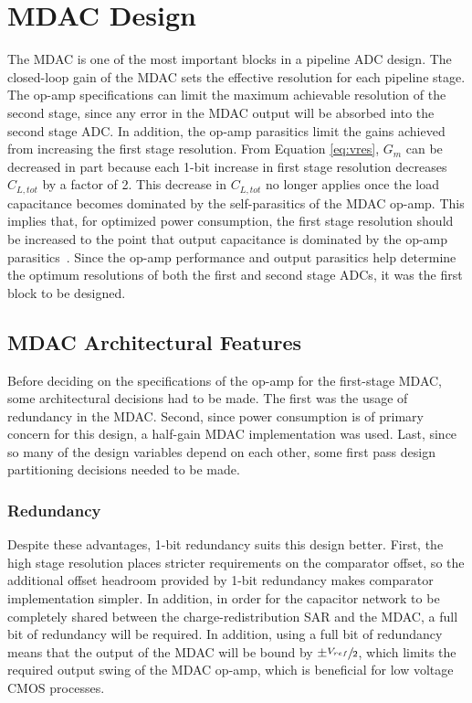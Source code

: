 \chapter{MDAC Design}
The MDAC is one of the most important blocks in a pipeline ADC design. The closed-loop gain of the MDAC sets the effective resolution for each pipeline stage. The op-amp specifications can limit the maximum achievable resolution of the second stage, since any error in the MDAC output will be absorbed into the second stage ADC. In addition, the op-amp parasitics limit the gains achieved from increasing the first stage resolution. From Equation \ref{eq:vres}, $G_m$ can be decreased in part because each 1-bit increase in first stage resolution decreases $C_{L,tot}$ by a factor of 2. This decrease in $C_{L,tot}$ no longer applies once the load capacitance becomes dominated by the self-parasitics of the MDAC op-amp. This implies that, for optimized power consumption, the first stage resolution should be increased to the point that output capacitance is dominated by the op-amp parasitics~\cite{5714725}. Since the op-amp performance and output parasitics help determine the optimum resolutions of both the first and second stage ADCs, it was the first block to be designed. 
\section{MDAC Architectural Features}
Before deciding on the specifications of the op-amp for the first-stage MDAC, some architectural decisions had to be made. The first was the usage of redundancy in the MDAC. Second, since power consumption is of primary concern for this design, a half-gain MDAC implementation was used. Last, since so many of the design variables depend on each other, some first pass design partitioning decisions needed to be made.
\subsection{Redundancy}
Despite these advantages, 1-bit redundancy suits this design better. First, the high stage resolution places stricter requirements on the comparator offset, so the additional offset headroom provided by 1-bit redundancy makes comparator implementation simpler. In addition, in order for the capacitor network to be completely shared between the charge-redistribution SAR and the MDAC, a full bit of redundancy will be required. In addition, using a full bit of redundancy means that the output of the MDAC will be bound by $\pm\sfrac{V_{ref}}{2}$, which limits the required output swing of the MDAC op-amp, which is beneficial for low voltage CMOS processes.
